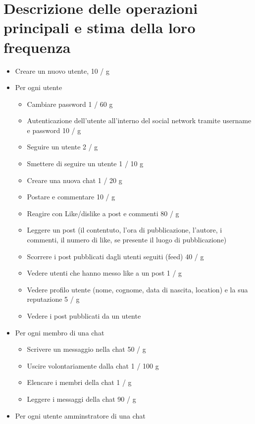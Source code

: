 \documentclass[a4paper,12pt]{report}
\begin{document}
\section{Descrizione delle operazioni principali e stima della loro frequenza}
\begin{itemize}
  \item Creare un nuovo utente, 10 / g
  \item {
    Per ogni utente
    \begin{itemize}
      \item Cambiare password 1 / 60 g
      \item Autenticazione dell'utente all'interno del social network tramite username e password 10 / g
      \item Seguire un utente 2 / g
      \item Smettere di seguire un utente 1 / 10 g
      \item Creare una nuova chat 1 / 20 g
      \item Postare e commentare 10 / g
      \item Reagire con Like/dislike a post e commenti 80 / g
      \item Leggere un post (il contentuto, l'ora di pubblicazione, l'autore, i commenti, il numero di like, se presente il luogo di pubblicazione)
      \item Scorrere i post pubblicati dagli utenti seguiti (feed) 40 / g
      \item Vedere utenti che hanno messo like a un post 1 / g
      \item Vedere profilo utente (nome, cognome, data di nascita, location) e la sua reputazione 5 / g
      \item Vedere i post pubblicati da un utente
    \end{itemize} 
  }
  \item {
      Per ogni membro di una chat
      \begin{itemize}
        \item Scrivere un messaggio nella chat 50 / g
        \item Uscire volontariamente dalla chat 1 / 100 g
        \item Elencare i membri della chat 1 / g
        \item Leggere i messaggi della chat 90 / g
      \end{itemize}
    }
  \item {
      Per ogni utente amminstratore di una chat 
      \begin{itemize}

\end{itemize}}
\end{itemize}
\end{document}

